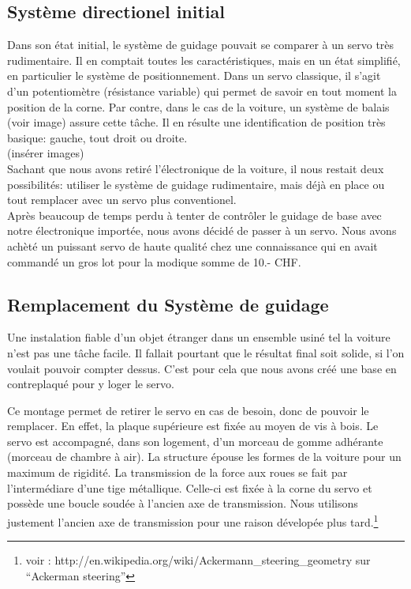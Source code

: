 \documentclass[a4paper,12pt]{article}
\begin{document}
{\subsection{Système directionel initial}
Dans son \'etat initial, le syst\`eme de guidage pouvait se comparer \`a un
servo tr\`es rudimentaire. Il en comptait toutes les caractéristiques, mais en
un état simplifié, en particulier le système de positionnement. Dans un servo
classique, il s'agit d'un potentiomètre (résistance variable) qui permet
de savoir en tout moment la position de la corne. Par contre, dans le cas de
la voiture, un système de balais (voir image) assure cette tâche. Il en
résulte une identification de position très basique: gauche, tout droit ou
droite.\\
(ins\'erer images)\\
Sachant que nous avons retir\'e l'\'electronique de la voiture, il nous restait
deux possibilit\'es: utiliser le syst\`eme de guidage rudimentaire, mais
d\'ej\`a en place ou tout remplacer avec un servo plus conventionel.\\
Apr\`es beaucoup de temps perdu \`a tenter de contr\^oler le guidage de base
avec notre \'electronique import\'ee, nous avons d\'ecidé de passer \`a un servo. Nous avons
ach\`eté un puissant servo de haute qualit\'e chez une connaissance qui en
avait command\'e un gros lot pour la modique somme de 10.- CHF.

\subsection{Remplacement du Système de guidage}
Une instalation fiable d'un objet \'etranger dans un ensemble usin\'e tel la
voiture n'est pas une t\^ache facile. Il fallait pourtant que le r\'esultat final
soit solide, si l'on voulait pouvoir compter dessus. C'est pour cela que nous avons
cr\'e\'e une base en contreplaqu\'e pour y loger le servo.

Ce montage permet de retirer le servo en cas de besoin, donc de pouvoir le
remplacer. En effet, la plaque sup\'erieure est fix\'ee au moyen de vis \`a
bois. Le servo est accompagn\'e, dans son logement, d'un morceau de gomme
adh\'erante (morceau de chambre \`a air). La structure \'epouse les formes de
la voiture pour un maximum de rigidit\'e. La transmission de la force aux
roues se fait par l'interm\'ediare d'une tige métallique. Celle-ci est
fix\'ee \`a la corne du servo et possède une boucle soud\'ee \`a l'ancien axe de
transmission. Nous utilisons justement l'ancien axe de transmission pour une
raison d\'evelop\'ee plus tard.\footnote{voir :
http://en.wikipedia.org/wiki/Ackermann\_steering\_geometry sur
``Ackerman steering''}

}
\end{document}
